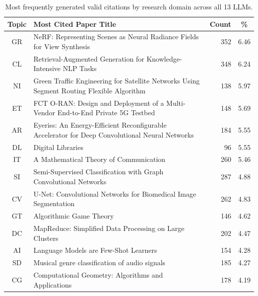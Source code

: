 \begin{table}[t]
\centering
\caption{Most frequently generated valid citations by research domain across all 13 LLMs.}
\label{tab:most_cited_by_topic}
\small
{}
\begin{tabular}{clrc}
\toprule
\textbf{Topic} & \textbf{Most Cited Paper Title} & \textbf{Count} & \textbf{\%} \\
\midrule
GR & NeRF: Representing Scenes as Neural Radiance Fields for View Synthesis & \cellcolor{green!28}352 & \cellcolor{green!28}6.46 \\
CL & Retrieval-Augmented Generation for Knowledge-Intensive NLP Tasks & \cellcolor{green!28}348 & \cellcolor{green!28}6.24 \\
NI & Green Traffic Engineering for Satellite Networks Using Segment Routing Flexible Algorithm & \cellcolor{green!24}138 & \cellcolor{green!24}5.97 \\
ET & FCT O-RAN: Design and Deployment of a Multi-Vendor End-to-End Private 5G Testbed & \cellcolor{green!24}148 & \cellcolor{green!24}5.69 \\
AR & Eyeriss: An Energy-Efficient Reconfigurable Accelerator for Deep Convolutional Neural Networks & \cellcolor{green!24}184 & \cellcolor{green!24}5.55 \\
DL & Digital Libraries & \cellcolor{green!24}96 & \cellcolor{green!24}5.55 \\
IT & A Mathematical Theory of Communication & \cellcolor{green!24}260 & \cellcolor{green!24}5.46 \\
SI & Semi-Supervised Classification with Graph Convolutional Networks & \cellcolor{green!16}287 & \cellcolor{green!16}4.88 \\
CV & U-Net: Convolutional Networks for Biomedical Image Segmentation & \cellcolor{green!16}262 & \cellcolor{green!16}4.83 \\
GT & Algorithmic Game Theory & \cellcolor{green!16}146 & \cellcolor{green!16}4.62 \\
DC & MapReduce: Simplified Data Processing on Large Clusters & \cellcolor{green!16}202 & \cellcolor{green!16}4.47 \\
AI & Language Models are Few-Shot Learners & \cellcolor{green!16}154 & \cellcolor{green!16}4.28 \\
SD & Musical genre classification of audio signals & \cellcolor{green!16}185 & \cellcolor{green!16}4.27 \\
CG & Computational Geometry: Algorithms and Applications & \cellcolor{green!16}178 & \cellcolor{green!16}4.19 \\

\end{tabular}
\end{table}
